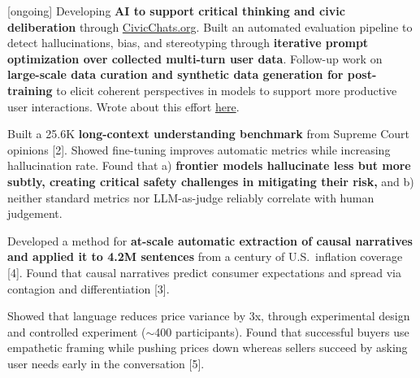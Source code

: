 \documentclass[11pt,letterpaper]{article}
\begin{document}
\begin{cvitems}
    \item {[ongoing]} Developing \textbf{AI to support critical thinking and civic deliberation} through \href{https://civicchats.org}{CivicChats.org}. Built an automated evaluation pipeline to detect hallucinations, bias, and stereotyping through \textbf{iterative prompt optimization over collected multi-turn user data}. Follow-up work on \textbf{large-scale data curation and synthetic data generation for post-training} to elicit coherent perspectives in models to support more productive user interactions. Wrote about this effort \href{https://open.substack.com/pub/cichicago/p/civicchats-building-ai-to-support}{here}.
    \item Built a 25.6K \textbf{long-context understanding benchmark} from Supreme Court opinions [2]. Showed fine-tuning improves automatic metrics while increasing hallucination rate. Found that a) \textbf{frontier models hallucinate less but more subtly, creating critical safety challenges in mitigating their risk,} and b) neither standard metrics nor LLM-as-judge reliably correlate with human judgement.
    \item Developed a method for \textbf{at-scale automatic extraction of causal narratives and applied it to 4.2M sentences} from a century of U.S.\ inflation coverage [4]. Found that causal narratives predict consumer expectations and spread via contagion and differentiation [3].
    \item Showed that language reduces price variance by 3x, through experimental design and controlled experiment ($\sim$400 participants). Found that successful buyers use empathetic framing while pushing prices down whereas sellers succeed by asking user needs early in the conversation [5].
    
\end{cvitems}
\end{document}
